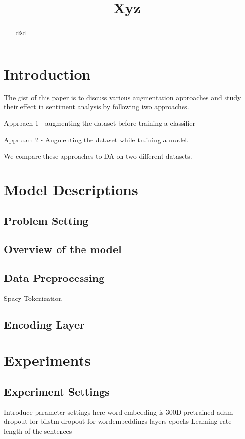 \documentclass{article}
\title{Xyz}
\begin{document}
\maketitle

\begin{abstract}
dfsd
\end{abstract}

\section{Introduction}
The gist of this paper is to discuss various augmentation approaches and study their effect in sentiment analysis by following two approaches.

Approach 1 - augmenting the dataset before training a classifier

Approach 2 - Augmenting the dataset while training a model.

We compare these approaches to DA on two different datasets.

\section{Model Descriptions}
\subsection{Problem Setting}
\subsection{Overview of the model}
\subsection{Data Preprocessing}
Spacy Tokenization \cite{srinivasa2018natural}
\subsection{Encoding Layer}

\section{Experiments}
\subsection{Experiment Settings}
Introduce parameter settings here
word embedding is 300D pretrained
adam
dropout for bilstm
dropout for wordembeddings
layers
epochs
Learning rate 
length of the sentences
\end{document}
